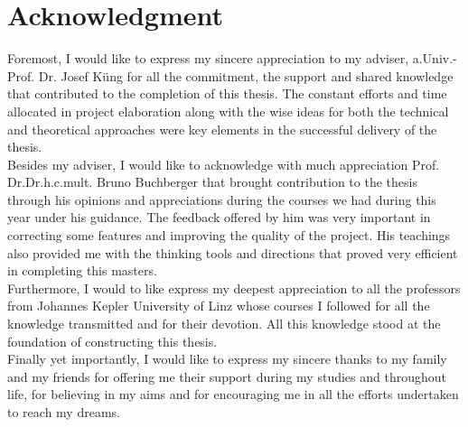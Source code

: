 \chapter*{Acknowledgment}
\indent Foremost, I would like to express my sincere appreciation to my adviser, a.Univ.-Prof. Dr. Josef Küng for all the commitment, the support and shared knowledge that contributed to the completion of this thesis. The constant efforts and time allocated in project elaboration along with the wise ideas for both the technical and theoretical approaches were key elements in the successful delivery of the thesis.\\
\indent Besides my adviser, I would like to acknowledge with much appreciation Prof. Dr.Dr.h.c.mult. Bruno Buchberger that brought contribution to the thesis through his opinions and appreciations during the courses we had during this year under his guidance. The feedback offered by him was very important in correcting some features and improving the quality of the project. His teachings also provided me with the thinking tools and directions that proved very efficient in completing this masters.\\
\indent Furthermore, I would to like express my deepest appreciation to all the professors from Johannes Kepler University of Linz whose courses I followed for all the knowledge transmitted and for their devotion. All this knowledge stood at the foundation of constructing this thesis.\\
\indent Finally yet importantly, I would like to express my sincere thanks to my family and my friends for offering me their support during my studies and throughout life, for believing in my aims and for encouraging me in all the efforts undertaken to reach my dreams.